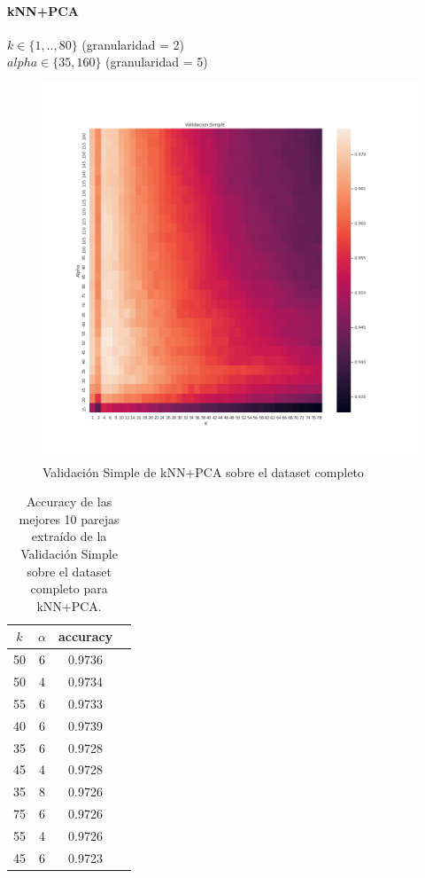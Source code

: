 \paragraph{kNN+PCA}

\par

$ k \in \{1,..,80\}$ (granularidad = 2)\\$alpha \in \{  35, 160 \}$ (granularidad = 5)

\begin{figure}[H]
    \centering
    \includegraphics[width=12cm]{images/validacionSimple_datasetCompleto_knnpca_k80}%
    \qquad
    \caption{Validación Simple de kNN+PCA sobre el dataset completo}
    \label{knnpca_valSimpleCompleto}%
\end{figure}


\begin{table}[h!]
    \begin{center}
        \begin{tabular}{|c|c|c|c|}
        \hline
        \textbf{$k$} & \textbf{$\alpha$} & \textbf{accuracy} \\
        \hline
        50 & 6 & 0.9736\\
        50 & 4 & 0.9734\\
        55 & 6 & 0.9733\\
        40 & 6 & 0.9739\\
        35 & 6 & 0.9728\\
        45 & 4 & 0.9728\\
        35 & 8 & 0.9726\\
        75 & 6 & 0.9726\\
        55 & 4 & 0.9726\\
        45 & 6 & 0.9723\\
        
        \hline
        \end{tabular}
        \caption{Accuracy de las mejores 10 parejas extraído de la Validación Simple sobre el dataset completo para kNN+PCA.}
        \label{knnpca_valSimple_table}
    \end{center}
\end{table}

